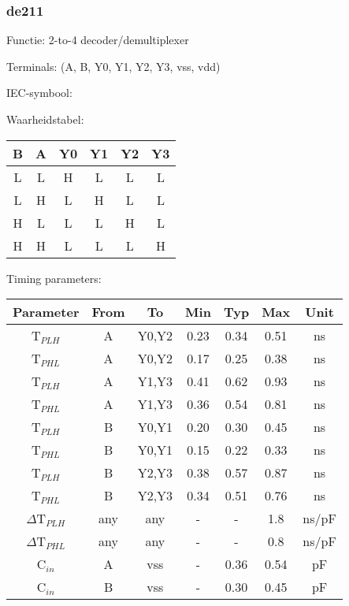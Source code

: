 \subsubsection{de211}

Functie: 2-to-4 decoder/demultiplexer

Terminals: (A, B, Y0, Y1, Y2, Y3, vss, vdd)


IEC-symbool:
\begin{figure}[bth]
\end{figure}

Waarheidstabel:
\begin{table}[bth]
\begin{tabular}{|cc||cccc|}
\hline
B	&A	&Y0	&Y1	&Y2	&Y3\\
\hline
L	&L	&H	&L	&L	&L\\
L	&H	&L	&H	&L	&L\\
H	&L	&L	&L	&H	&L\\
H	&H	&L	&L	&L	&H\\	
\hline
\end{tabular}
\vspace{1cm}


Timing parameters:\\

\begin{tabular}{|c|cc|ccc|c|}
\hline
Parameter               &From            &To   &Min	&Typ	&Max    &Unit\\
\hline
T$_{PLH}$               &A     		&Y0,Y2  &0.23	&0.34	&0.51    &ns\\
T$_{PHL}$               &A     		&Y0,Y2  &0.17	&0.25	&0.38    &ns\\
T$_{PLH}$               &A     		&Y1,Y3  &0.41	&0.62	&0.93    &ns\\
T$_{PHL}$               &A     		&Y1,Y3  &0.36	&0.54	&0.81    &ns\\
T$_{PLH}$               &B	    	&Y0,Y1  &0.20	&0.30	&0.45    &ns\\
T$_{PHL}$               &B	    	&Y0,Y1  &0.15	&0.22	&0.33    &ns\\
T$_{PLH}$               &B	    	&Y2,Y3  &0.38	&0.57	&0.87    &ns\\
T$_{PHL}$               &B	    	&Y2,Y3  &0.34	&0.51	&0.76    &ns\\
\hline
$\Delta$T$_{PLH}$       &any           &any   &-	&-	&1.8    &ns/pF\\
$\Delta$T$_{PHL}$       &any           &any   &-	&-	&0.8    &ns/pF\\
\hline
C$_{in}$                &A   		&vss    &-	&0.36	&0.54   &pF\\
C$_{in}$                &B             	&vss    &-	&0.30	&0.45   &pF\\
\hline
\end{tabular}
\end{table}

